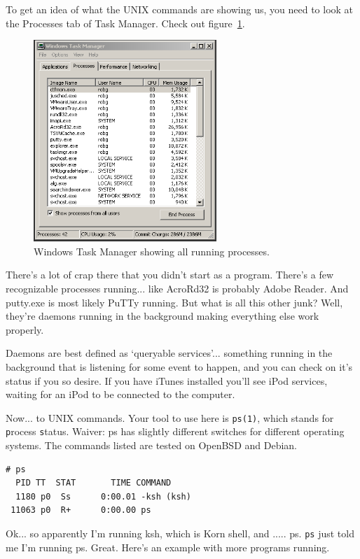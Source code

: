 To get an idea of what the UNIX commands are showing us, you need
to look at the Processes tab of  Task Manager. Check out figure~\ref{fig:Explorer-Processes}.
\begin{figure}[htbp]
	\centering
		\includegraphics[height=3in]{shell/Explorer-Processes.png}
	\caption{Windows Task Manager showing all running processes.}
	\label{fig:Explorer-Processes}
\end{figure}
There's a lot of crap there that you didn't start as a program. There's a few
recognizable processes running... like AcroRd32 is probably Adobe Reader. And putty.exe
is most likely PuTTy running. But what is all this other junk? Well, they're daemons running in the
background making everything else work properly. 

Daemons are best defined as `queryable services'... something running 
in the background that is listening for some event to happen, and 
you can check on it's status if you so desire. If you have iTunes installed
you'll see iPod services, waiting for an iPod to be connected to the computer.

Now... to UNIX commands. Your tool to use here is {\tt ps(1)}, which stands for
{\tt p}rocess {\tt s}tatus. Waiver: ps has slightly different switches for different
operating systems. The commands listed are tested on OpenBSD and Debian.

{\tt \begin{verbatim}
# ps
  PID TT  STAT       TIME COMMAND
  1180 p0  Ss      0:00.01 -ksh (ksh)
 11063 p0  R+      0:00.00 ps
\end{verbatim}
}

Ok... so apparently I'm running ksh, which is Korn shell, and ..... ps.  {\tt ps} 
just told me I'm running ps. Great. Here's an example with more programs running.

